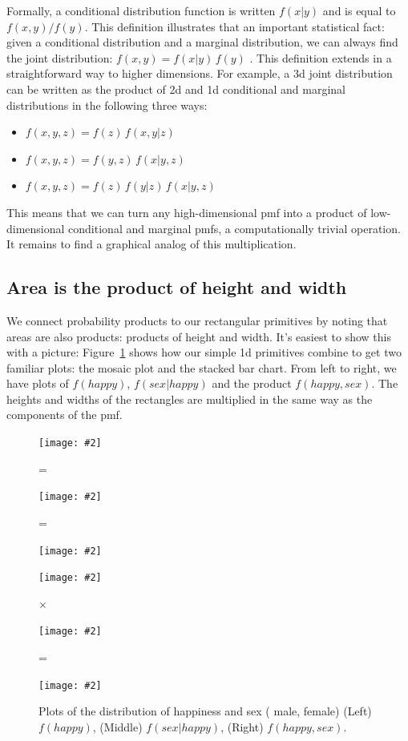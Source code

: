 \documentclass[journal]{vgtc}
\newcommand{\key}[1]
  {\protect \tikz{\fill[#1] rectangle (1ex,1ex);}}
\newcommand{\includegraphicsinline}[2]{\begin{minipage}{#1}\texttt{[image: \#2]}\end{minipage}}
\begin{document}
Formally, a conditional distribution function is written $f(x | y)$ and is equal to $f(x, y) / f(y)$. This definition illustrates that an important statistical fact: given a conditional distribution and a marginal distribution, we can always find the joint distribution: $f(x, y) = f(x | y)\,f(y)$ \footnotemark. This definition extends in a straightforward way to higher dimensions. For example, a 3d joint distribution can be written as the product of 2d and 1d conditional and marginal distributions in the following three ways:

\begin{itemize}
  \setlength{\itemsep}{0em}
  \item $f(x, y, z) = f(z)\,f(x, y | z)$
  \item $f(x, y, z) = f(y, z)\,f(x | y, z) $
  \item $f(x, y, z) = f(z)\,f(y | z)\,f(x | y, z)$
\end{itemize}


This means that we can turn any high-dimensional {\sc pmf} into a product of low-dimensional conditional and marginal {\sc pmf}s, a computationally trivial operation. It remains to find a graphical analog of this multiplication. 

\subsection{Area is the product of height and width}

We connect probability products to our rectangular primitives by noting that areas are also products: products of height and width. It's easiest to show this with a picture: Figure~\ref{fig:fact-simple} shows how our simple 1d primitives combine to get two familiar plots: the mosaic plot and the stacked bar chart. From left to right, we have plots of $f(happy)$, $f(sex | happy)$ and the product $f(happy, sex)$. The heights and widths of the rectangles are multiplied in the same way as the components of the {\sc pmf}.

\begin{figure}[htbp]
  \centering
  \includegraphicsinline{0.3\linewidth}{fact-happy} = %
  \includegraphicsinline{0.3\linewidth}{fact-happy|sex} = %
  \includegraphicsinline{0.3\linewidth}{fact-happy-sex}

  \includegraphicsinline{0.3\linewidth}{fact-happy-2} $\times$ %
  \includegraphicsinline{0.3\linewidth}{fact-happy|sex-2} = %
  \includegraphicsinline{0.3\linewidth}{fact-happy-sex-2}

  \caption{Plots of the distribution of happiness and sex (\key{male} male, \key{female} female) (Left) $f(happy)$, (Middle) $f(sex | happy)$, (Right) $f(happy, sex)$.}
  \label{fig:fact-simple}
\end{figure}
\end{document}

